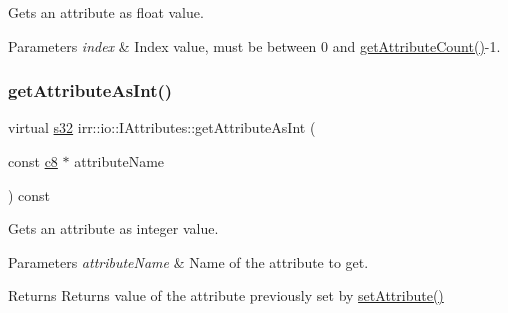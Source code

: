 Gets an attribute as float value. 


\begin{DoxyParams}{Parameters}
{\em index} & Index value, must be between 0 and \hyperlink{classirr_1_1io_1_1IAttributes_a796bdd9440ee7ba0b6742a90a82870b6}{get\+Attribute\+Count()}-\/1. \\
\hline
\end{DoxyParams}
\mbox{\label{classirr_1_1io_1_1IAttributes_ac6c51254c9d43cb58cb89866cdd210ed}} 
\subsubsection{\texorpdfstring{get\+Attribute\+As\+Int()}{getAttributeAsInt()}\hspace{0.1cm}{\footnotesize\ttfamily [1/4]}}
{\footnotesize\ttfamily virtual \hyperlink{namespaceirr_ac66849b7a6ed16e30ebede579f9b47c6}{s32} irr\+::io\+::\+I\+Attributes\+::get\+Attribute\+As\+Int (\begin{DoxyParamCaption}\item[{const \hyperlink{namespaceirr_a9395eaea339bcb546b319e9c96bf7410}{c8} $\ast$}]{attribute\+Name }\end{DoxyParamCaption}) const\hspace{0.3cm}{\ttfamily [pure virtual]}}



Gets an attribute as integer value. 


\begin{DoxyParams}{Parameters}
{\em attribute\+Name} & Name of the attribute to get. \\
\hline
\end{DoxyParams}
\begin{DoxyReturn}{Returns}
Returns value of the attribute previously set by \hyperlink{classirr_1_1io_1_1IAttributes_a03fa31acb481ae23678676cc183f09a6}{set\+Attribute()} 
\end{DoxyReturn}
\mbox{\label{classirr_1_1io_1_1IAttributes_ac6c51254c9d43cb58cb89866cdd210ed}} 
